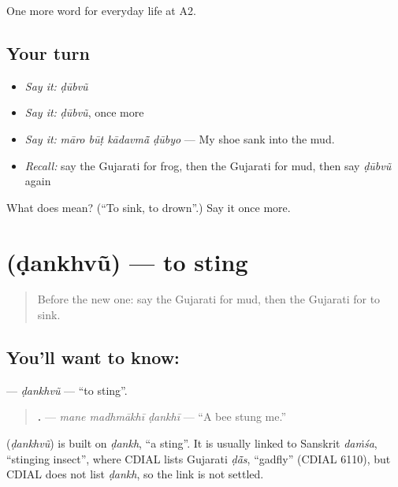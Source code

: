 \begin{grammarlens}[title={What you've built}]
One more word for everyday life at A2.
\end{grammarlens}

\subsection*{Your turn}
\begin{itemize}
\raggedright
  \item \emph{Say it:} \emph{ḍūbvũ}
  \item \emph{Say it:} \emph{ḍūbvũ}, once more
  \item \emph{Say it:} \emph{māro būṭ kādavmā̃ ḍūbyo} — My shoe sank into the mud.
  \item \emph{Recall:} say the Gujarati for frog, then the Gujarati for mud, then say \emph{ḍūbvũ} again
\end{itemize}

\begin{tcolorbox}[breakable,colback=teal!4,colframe=teal!35!black,title={Before you move on}]
What does  mean? (\textquotedblleft{}To sink, to drown\textquotedblright{}.) Say it once more.
\end{tcolorbox}
\section[\texorpdfstring{\gu{ડંખવું} (ḍankhvũ)}{ડંખવું (ḍankhvũ)}]{ (ḍankhvũ) — to sting}

\label{lesson:GU-C239-dankhvu}



\begin{quote}
Before the new one: say the Gujarati for mud, then the Gujarati for to sink.
\end{quote}

\subsection*{You'll want to know: }
\textbf{} — \emph{ḍankhvũ} — \textquotedblleft{}to sting\textquotedblright{}.

\begin{quote}
\textbf{  .} — \emph{mane madhmākhī ḍankhī} — \textquotedblleft{}A bee stung me.\textquotedblright{}
\end{quote}

\begin{cousinweb}
\textbf{} (\emph{ḍankhvũ}) is built on \emph{ḍankh}, \textquotedblleft{}a sting\textquotedblright{}. It is usually linked to Sanskrit \emph{daṁśa}, \textquotedblleft{}stinging insect\textquotedblright{}, where CDIAL lists Gujarati \emph{ḍā̃s}, \textquotedblleft{}gadfly\textquotedblright{} (CDIAL 6110), but CDIAL does not list \emph{ḍankh}, so the link is not settled.
\end{cousinweb}

